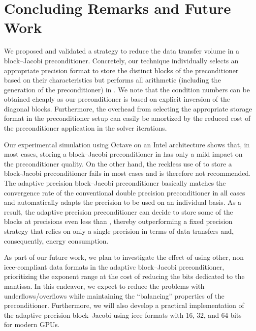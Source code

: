 \section{Concluding Remarks and Future Work} \label{2017-adaptive-block-jacobi:sec:summary}

We proposed and validated a strategy to reduce the data transfer volume in
a block--Jacobi preconditioner. Concretely, our technique individually selects
an appropriate precision format to store the distinct blocks of the
preconditioner based on their characteristics but performs all arithmetic
(including the generation of the preconditioner) in \fpd. We note
that the condition numbers can be obtained cheaply as our preconditioner is
based on explicit inversion of the diagonal blocks.
Furthermore, the overhead from selecting the appropriate storage format in the
preconditioner setup can easily be amortized by the reduced cost of the
preconditioner application in the solver iterations.

Our experimental simulation using Octave on an Intel architecture shows that, in
most cases, storing a block--Jacobi preconditioner in \fps has only a
mild impact on the preconditioner quality. On the other hand, the reckless use 
of \fph to
store a block-Jacobi preconditioner fails in most cases and is therefore not 
recommended. The adaptive precision block--Jacobi preconditioner basically
matches the convergence rate of the conventional double precision preconditioner
in all cases and automatically adapts the precision to be used on an individual
basis. As a result, the adaptive precision preconditioner can decide to store
some of the blocks at precisions even less than \fps, thereby outperforming a 
fixed precision strategy that relies on only a single precision in terms of data
transfers and, consequently, energy consumption.

As part of our future work, we plan to investigate the effect of using
other, non {\sc ieee}-compliant data formats in the adaptive block--Jacobi
preconditioner, prioritizing the exponent range at the cost of reducing the
bits dedicated to the mantissa. In this endeavor, we expect to reduce the
problems with underflows/overflows while maintaining the ``balancing''
properties of the preconditioner. Furthermore, we will also develop a
practical implementation of the adaptive precision block--Jacobi using {\sc
  ieee} formats with 16, 32, and 64 bits for modern GPUs.

